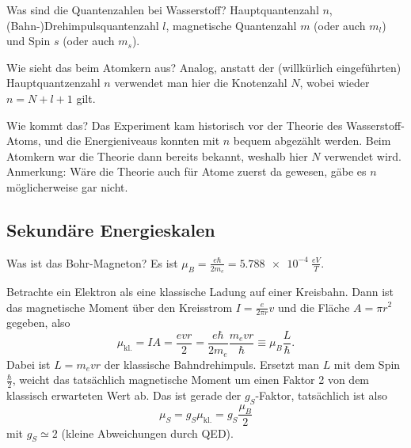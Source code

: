 \begin{fquestion}{Was sind die Quantenzahlen bei Wasserstoff?}
    Hauptquantenzahl $n$, (Bahn-)Drehimpulsquantenzahl $l$, magnetische Quantenzahl $m$ (oder auch $m_l$) und Spin $s$ (oder auch $m_s$).
\end{fquestion}

\begin{fquestion}{Wie sieht das beim Atomkern aus?}
    Analog, anstatt der (willkürlich eingeführten) Hauptquantzenzahl $n$ verwendet man hier die Knotenzahl $N$, wobei wieder $n = N+l+1$ gilt.
\end{fquestion}

\begin{fquestion}{Wie kommt das?}
    Das Experiment kam historisch vor der Theorie des Wasserstoff-Atoms, und die Energieniveaus konnten mit $n$ bequem abgezählt werden.
    Beim Atomkern war die Theorie dann bereits bekannt, weshalb hier $N$ verwendet wird.
    Anmerkung: Wäre die Theorie auch für Atome zuerst da gewesen, gäbe es $n$ möglicherweise gar nicht.
\end{fquestion}

\subsection{Sekundäre Energieskalen}


\begin{fquestion}{Was ist das Bohr-Magneton?}
    Es ist $\mu_B = \frac{e\hbar}{2m_e} = \SI{5.788e-4}{\frac{eV}{T}}$.
    
    Betrachte ein Elektron als eine klassische Ladung auf einer Kreisbahn.
    Dann ist das magnetische Moment über den Kreisstrom $I=\frac{e}{2\pi r}v$ und die Fläche $A=\pi r^2$ gegeben, also
    $$\mu_\mathrm{kl.} = IA = \frac{evr}{2} = \frac{e\hbar}{2m_e}\frac{m_e vr}{\hbar} \equiv \mu_B \frac{L}{\hbar}. $$
    Dabei ist $L = m_evr$ der klassische Bahndrehimpuls.
    Ersetzt man $L$ mit dem Spin $\frac{\hbar}{2}$, weicht das tatsächlich magnetische Moment um einen Faktor 2 von dem klassisch erwarteten Wert ab.
    Das ist gerade der $g_S$-Faktor, tatsächlich ist also
    $$\mu_S = g_S\mu_\mathrm{kl.} = g_S\frac{\mu_B}{2}$$
    mit $g_S\simeq 2$ (kleine Abweichungen durch QED).
\end{fquestion}


